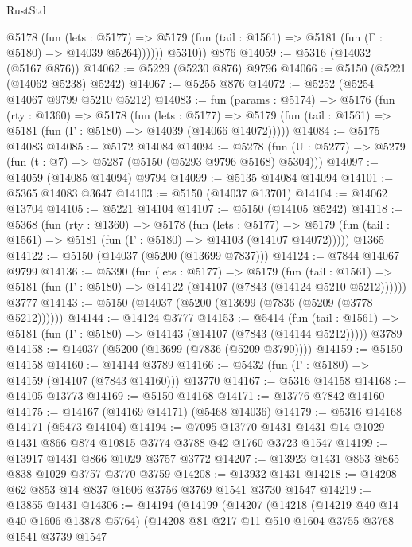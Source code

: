 \begin{lexlean}{RustStd}
\begin{coremodule}
            @5178
              (fun (lets : @5177) =>
              @5179 (fun (tail : @1561) => @5181 (fun (Γ : @5180) => @14039 @5264))))))
        @5310))
    @876
@14059 := @5316 (@14032 (@5167 @876))
@14062 := @5229 (@5230 @876) @9796
@14066 := @5150 (@5221 (@14062 @5238) @5242)
@14067 := @5255 @876
@14072 := @5252 (@5254 @14067 @9799 @5210 @5212)
@14083 := fun (params : @5174) =>
  @5176
    (fun (rty : @1360) =>
    @5178
      (fun (lets : @5177) =>
      @5179 (fun (tail : @1561) => @5181 (fun (Γ : @5180) => @14039 (@14066 @14072)))))
@14084 := @5175 @14083
@14085 := @5172 @14084
@14094 := @5278 (fun (U : @5277) => @5279 (fun (t : @7) => @5287 (@5150 (@5293 @9796 @5168) @5304)))
@14097 := @14059 (@14085 @14094) @9794
@14099 := @5135 @14084 @14094
@14101 := @5365 @14083 @3647
@14103 := @5150 (@14037 @13701)
@14104 := @14062 @13704
@14105 := @5221 @14104
@14107 := @5150 (@14105 @5242)
@14118 := @5368
    (fun (rty : @1360) =>
    @5178
      (fun (lets : @5177) =>
      @5179 (fun (tail : @1561) => @5181 (fun (Γ : @5180) => @14103 (@14107 @14072)))))
    @1365
@14122 := @5150 (@14037 (@5200 (@13699 @7837)))
@14124 := @7844 @14067 @9799
@14136 := @5390
    (fun (lets : @5177) =>
    @5179
      (fun (tail : @1561) =>
      @5181 (fun (Γ : @5180) => @14122 (@14107 (@7843 (@14124 @5210 @5212))))))
    @3777
@14143 := @5150 (@14037 (@5200 (@13699 (@7836 (@5209 (@3778 @5212))))))
@14144 := @14124 @3777
@14153 := @5414
    (fun (tail : @1561) => @5181 (fun (Γ : @5180) => @14143 (@14107 (@7843 (@14144 @5212)))))
    @3789
@14158 := @14037 (@5200 (@13699 (@7836 (@5209 @3790))))
@14159 := @5150 @14158
@14160 := @14144 @3789
@14166 := @5432 (fun (Γ : @5180) => @14159 (@14107 (@7843 @14160))) @13770
@14167 := @5316 @14158
@14168 := @14105 @13773
@14169 := @5150 @14168
@14171 := @13776 @7842 @14160
@14175 := @14167 (@14169 @14171) (@5468 @14036)
@14179 := @5316 @14168 @14171 (@5473 @14104)
@14194 := @7095
    @13770
    @1431
    @1431
    @14
    @1029
    @1431
    @866
    @874
    @10815
    @3774
    @3788
    @42
    @1760
    @3723
    @1547
@14199 := @13917 @1431 @866 @1029 @3757 @3772
@14207 := @13923 @1431 @863 @865 @838 @1029 @3757 @3770 @3759
@14208 := @13932 @1431
@14218 := @14208 @62 @853 @14 @837 @1606 @3756 @3769 @1541 @3730 @1547
@14219 := @13855 @1431
@14306 := @14194
    (@14199
      (@14207
        (@14218
          (@14219 @40 @14 @40 @1606 @13878 @5764)
          (@14208
            @81
            @217
            @11
            @510
            @1604
            @3755
            @3768
            @1541
            @3739
            @1547

\end{coremodule}
\end{lexlean}
